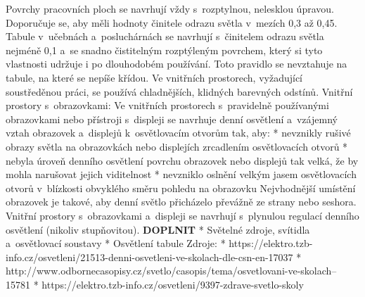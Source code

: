 Povrchy pracovních ploch se navrhují vždy s~rozptylnou, nelesklou úpravou. Doporučuje se, aby měli hodnoty
činitele odrazu světla v~mezích 0,3 až 0,45.
\medskip
Tabule v~učebnách a~posluchárnách se navrhují s~činitelem odrazu světla nejméně 0,1 a~se snadno čistitelným
rozptýleným povrchem, který si tyto vlastnosti udržuje i po dlouhodobém používání.
Toto pravidlo se nevztahuje na tabule, na které se nepíše křídou.
\medskip
Ve vnitřních prostorech, vyžadující soustředěnou práci, se používá chladnějších, klidných barevných odstínů.
\medskip
Vnitřní prostory s~obrazovkami:
\medskip
Ve vnitřních prostorech s~pravidelně používanými obrazovkami nebo přístroji s~displeji se navrhuje denní
osvětlení a~vzájemný vztah obrazovek a~displejů k~osvětlovacím otvorům tak, aby:
\medskip
\begitems
    * nevznikly rušivé obrazy světla na obrazovkách nebo displejích zrcadlením osvětlovacích otvorů
    * nebyla úroveň denního osvětlení povrchu obrazovek nebo displejů tak velká, že by mohla narušovat jejich viditelnost
    * nevzniklo oslnění velkým jasem osvětlovacích otvorů v~blízkosti obvyklého směru pohledu na obrazovku
\enditems
\medskip
Nejvhodnější umístění obrazovek je takové, aby denní světlo přicházelo převážně ze strany nebo seshora.
\medskip
Vnitřní prostory s~obrazovkami a~displeji se navrhují s~plynulou regulací denního osvětlení (nikoliv stupňovitou).
\medskip
{\bf DOPLNIT}
\begitems
* Světelné zdroje, svítidla a~osvětlovací soustavy
* Osvětlení tabule
\enditems
\medskip
{\sbf Zdroje:}
\begitems
* https://elektro.tzb-info.cz/osvetleni/21513-denni-osvetleni-ve-skolach-dle-csn-en-17037
* http://www.odbornecasopisy.cz/svetlo/casopis/tema/osvetlovani-ve-skolach--15781
* https://elektro.tzb-info.cz/osvetleni/9397-zdrave-svetlo-skoly
\enditems





